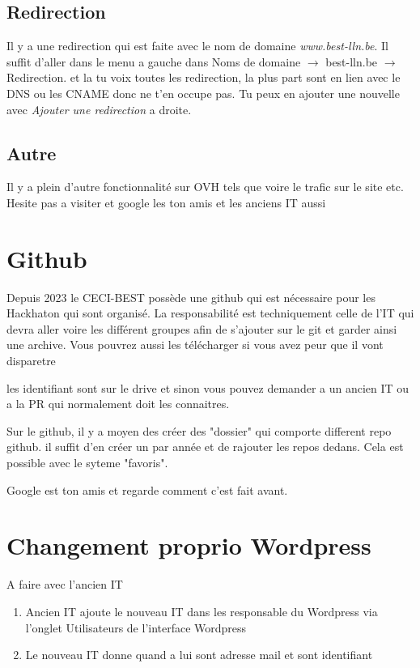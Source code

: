 \documentclass[12pt]{article}
\begin{document}
	\subsection{Redirection}
		Il y a une redirection qui est faite avec le nom de domaine \textit{www.best-lln.be}. Il suffit d'aller dans le menu a gauche dans Noms de domaine $\rightarrow$ best-lln.be $\rightarrow$ Redirection. et la tu voix toutes les redirection, la plus part sont en lien avec le DNS ou les CNAME donc ne t'en occupe pas. Tu peux en ajouter une nouvelle avec \textit{Ajouter une redirection} a droite.
		
	\subsection{Autre}
		Il y a plein d'autre fonctionnalité sur OVH tels que voire le trafic sur le site etc. Hesite pas a visiter et google les ton amis et les anciens IT aussi
		
\section{Github}
	Depuis 2023 le CECI-BEST possède une github qui est nécessaire pour les Hackhaton qui sont organisé. La responsabilité est techniquement celle de l'IT qui devra aller voire les différent groupes afin de s'ajouter sur le git et garder ainsi une archive. Vous pouvrez aussi les télécharger si vous avez peur que il vont disparetre
	
	les identifiant sont sur le drive et sinon vous pouvez demander a un ancien IT ou a la PR qui normalement doit les connaitres.

	Sur le github, il y a moyen des créer des "dossier" qui comporte different repo github. il suffit d'en créer un par année et de rajouter les repos dedans. Cela est possible avec le syteme "favoris".
	
	Google est ton amis et regarde comment c'est fait avant.
	
\section{Changement proprio Wordpress}
	A faire avec l'ancien IT
	\begin{enumerate}
		\item Ancien IT ajoute le nouveau IT dans les responsable du Wordpress via l’onglet Utilisateurs de l’interface Wordpress

		\item Le nouveau IT donne quand a lui sont adresse mail et sont identifiant
	\end{enumerate}
	
\end{document}
